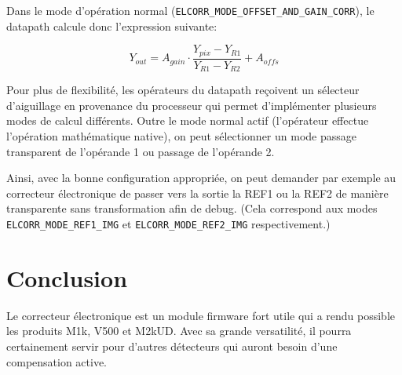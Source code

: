 \documentclass[11pt]{report}
\begin{document}
Dans le mode d'opération normal (\texttt{ELCORR\_MODE\_OFFSET\_AND\_GAIN\_CORR}), le datapath calcule donc l'expression suivante:

\[ Y_{out}=A_{gain}\cdot\frac{Y_{pix}-Y_{R1}}{Y_{R1}-Y_{R2}}+A_{offs} \]

Pour plus de flexibilité, les opérateurs du datapath reçoivent un sélecteur d'aiguillage en provenance du processeur qui permet d'implémenter plusieurs modes de calcul différents. Outre le mode normal actif (l'opérateur effectue l'opération mathématique native), on peut sélectionner un mode passage transparent de l'opérande 1 ou passage de l'opérande 2. 

Ainsi, avec la bonne configuration appropriée, on peut demander par exemple au correcteur électronique de passer vers la sortie la REF1 ou la REF2 de manière transparente sans transformation afin de debug. (Cela correspond aux modes \texttt{ELCORR\_MODE\_REF1\_IMG} et \texttt{ELCORR\_MODE\_REF2\_IMG} respectivement.)

\section{Conclusion}
Le correcteur électronique est un module firmware fort utile qui a rendu possible les produits M1k, V500 et M2kUD. Avec sa grande versatilité, il pourra certainement servir pour d'autres détecteurs qui auront besoin d'une compensation active.
\end{document}
